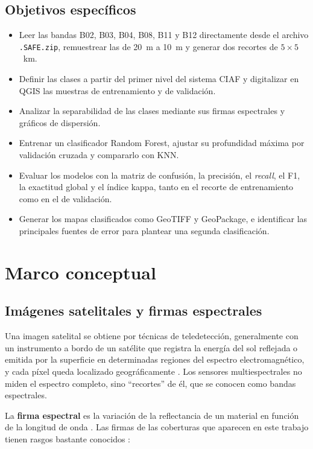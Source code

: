 \documentclass[11pt,letterpaper]{article}
\begin{document}
\subsection{Objetivos específicos}
\begin{itemize}
    \item Leer las bandas B02, B03, B04, B08, B11 y B12 directamente desde el archivo \texttt{.SAFE.zip},
    remuestrear las de 20~m a 10~m y generar dos recortes de $5\times5$~km.
    \item Definir las clases a partir del primer nivel del sistema CIAF y digitalizar en QGIS las muestras
    de entrenamiento y de validación.
    \item Analizar la separabilidad de las clases mediante sus firmas espectrales y gráficos de dispersión.
    \item Entrenar un clasificador Random Forest, ajustar su profundidad máxima por validación cruzada y
    compararlo con KNN.
    \item Evaluar los modelos con la matriz de confusión, la precisión, el \emph{recall}, el F1, la
    exactitud global y el índice kappa, tanto en el recorte de entrenamiento como en el de validación.
    \item Generar los mapas clasificados como GeoTIFF y GeoPackage, e identificar las principales fuentes de
    error para plantear una segunda clasificación.
\end{itemize}

\section{Marco conceptual}
\label{sec:marco}

\subsection{Imágenes satelitales y firmas espectrales}
Una imagen satelital se obtiene por técnicas de teledetección, generalmente con un instrumento a bordo de un satélite que registra la
energía del sol reflejada o emitida por la superficie en determinadas regiones del espectro electromagnético, y
cada píxel queda localizado geográficamente \citep{gulich}. Los sensores multiespectrales no miden el
espectro completo, sino ``recortes'' de él, que se conocen como bandas espectrales.

La \textbf{firma espectral} es la variación de la reflectancia de un material en función de la longitud de
onda \citep{chuvieco2010}. Las firmas de las coberturas que aparecen en este trabajo tienen rasgos
bastante conocidos \citep{gulich}:
\end{document}

